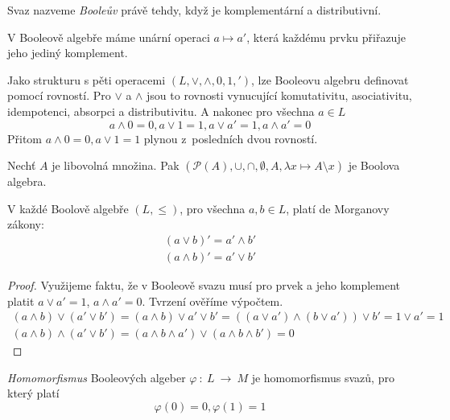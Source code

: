 \begin{definition}
    Svaz nazveme {\em Booleův} právě tehdy, když je komplementární a
    distributivní.
\end{definition}

\begin{corollary}
V Booleově algebře máme unární operaci $a \mapsto a'$, která každému
prvku přiřazuje jeho jediný komplement.
\end{corollary}

Jako strukturu s pěti operacemi $(L, \vee, \wedge, 0, 1, {'})$,
lze Booleovu algebru definovat pomocí rovností.
Pro $\vee$ a $\wedge$ jsou to rovnosti vynucující
komutativitu, asociativitu, idempotenci,
absorpci a distributivitu. A nakonec pro všechna $a \in L$
$$a \wedge 0 = 0, a \vee 1 = 1, a \vee a' = 1, a \wedge a' = 0$$
Přitom $a \wedge 0 = 0, a \vee 1 = 1$ plynou z~posledních dvou rovností.

\begin{example}
    Nechť $A$ je libovolná množina.
    Pak $(\mathcal{P}(A), \cup, \cap, \emptyset, A,
        \lambda x \mapsto A \setminus x)$ je Boolova algebra.
\end{example}

\begin{claim}
    V každé Boolově algebře $(L, \leq)$, pro všechna $a,b \in L$,
    platí de Morganovy zákony:
    \begin{align*}
    (a \vee b)' = a' \wedge b'\\
    (a \wedge b)' = a' \vee b'
    \end{align*}
\end{claim}

\begin{proof}
    Využijeme faktu, že v Booleově svazu musí pro prvek a jeho
    komplement
    platit $a \vee a' = 1$, $a \wedge a' = 0$. Tvrzení ověříme výpočtem.
    \begin{gather*}
    (a \wedge b) \vee (a' \vee b') = (a \wedge b) \vee a' \vee b' =
        ((a \vee a') \wedge (b \vee a')) \vee b' = 1 \vee a' = 1\\
    (a \wedge b) \wedge (a' \vee b') =
        (a \wedge b \wedge a') \vee (a \wedge b \wedge b') = 0
    \end{gather*}
\end{proof}

\begin{definition}[Homomorfismus]
    {\em Homomorfismus} Booleových algeber $\varphi~\colon~L~\to~M$
    je homomorfismus svazů, pro který platí
    \[
    \varphi(0) = 0, \varphi(1) = 1
    \]
\end{definition}

